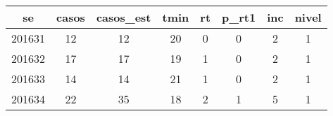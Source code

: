 \begin{tabular}{c|ccccccc}
  \hline
se & casos & casos\_est & tmin & rt & p\_rt1 & inc & nivel \\ 
  \hline
201631 & 12 & 12 & 20 & 0 & 0 & 2 & 1 \\ 
  201632 & 17 & 17 & 19 & 1 & 0 & 2 & 1 \\ 
  201633 & 14 & 14 & 21 & 1 & 0 & 2 & 1 \\ 
  201634 & 22 & 35 & 18 & 2 & 1 & 5 & 1 \\ 
   \hline
\end{tabular}
